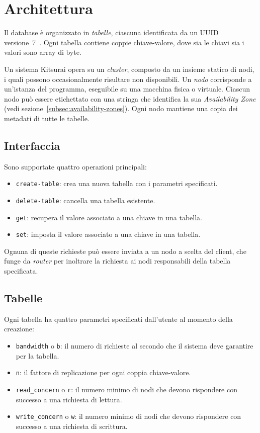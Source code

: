 \section{Architettura}
\label{sec:architettura}

Il database è organizzato in \emph{tabelle}, ciascuna identificata da un UUID versione~7~\cite{rfc9562}.
Ogni tabella contiene coppie chiave-valore, dove sia le chiavi sia i valori sono array di byte.

Un sistema Kitsurai opera su un \emph{cluster}, composto da un insieme statico di nodi, i quali possono occasionalmente risultare non disponibili.
Un \emph{nodo} corrisponde a un'istanza del programma, eseguibile su una macchina fisica o virtuale.
Ciascun nodo può essere etichettato con una stringa che identifica la sua \emph{Availability Zone} (vedi sezione~\ref{subsec:availability-zones}).
Ogni nodo mantiene una copia dei metadati di tutte le tabelle.

\subsection{Interfaccia}
\label{subsec:interfaccia}

Sono supportate quattro operazioni principali:
\begin{itemize}
    \item \texttt{create-table}: crea una nuova tabella con i parametri specificati.
    \item \texttt{delete-table}: cancella una tabella esistente.
    \item \texttt{get}: recupera il valore associato a una chiave in una tabella.
    \item \texttt{set}: imposta il valore associato a una chiave in una tabella.
\end{itemize}

Ognuna di queste richieste può essere inviata a un nodo a scelta del client, che funge da \emph{router} per inoltrare la richiesta ai nodi responsabili della tabella specificata.

\subsection{Tabelle}
\label{subsec:tabelle}

Ogni tabella ha quattro parametri specificati dall'utente al momento della creazione:
\begin{itemize}
    \item \texttt{bandwidth} o \texttt{b}: il numero di richieste al secondo che il sistema deve garantire per la tabella.
    \item \texttt{n}: il fattore di replicazione per ogni coppia chiave-valore.
    \item \texttt{read\_concern} o \texttt{r}: il numero minimo di nodi che devono rispondere con successo a una richiesta di lettura.
    \item \texttt{write\_concern} o \texttt{w}: il numero minimo di nodi che devono rispondere con successo a una richiesta di scrittura.
\end{itemize}

